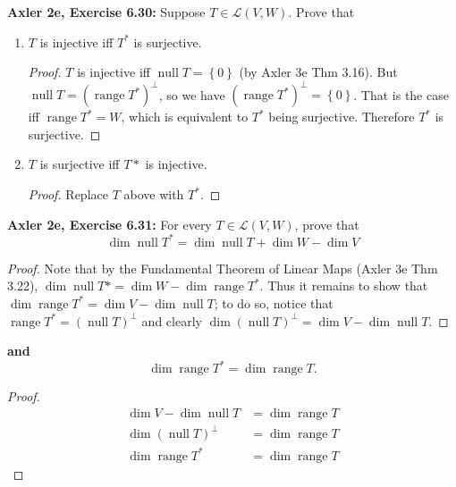 \documentclass{article}
\newcommand{\set}[1]{\left\{ #1 \right\}}
\DeclareMathOperator{\range}{range}
\DeclareMathOperator{\nulle}{null}
\begin{document}


\textbf{Axler 2e, Exercise 6.30: } %
Suppose $T \in \mathcal{L}(V, W)$. Prove that

\begin{enumerate}
    \item 
    $T$ is injective iff $T^*$ is surjective.
    \begin{proof}
        $T$ is injective iff $\nulle T = \set{0}$ (by Axler 3e Thm 3.16). But $\nulle T = (\range T^*)^\perp$, so we have $(\range T^*)^\perp = \set{0}$. That is the case iff $\range T^* = W$, which is equivalent to $T^*$ being surjective.
        Therefore $T^*$ is surjective.
    \end{proof}


    \item 
    $T$ is surjective iff $T*$ is injective.
    \begin{proof}
        Replace $T$ above with $T^*$.        
    \end{proof}
\end{enumerate}




\textbf{Axler 2e, Exercise 6.31: }
For every $T \in \mathcal{L}(V, W)$, prove that
$$\dim \nulle T^* = \dim \nulle T + \dim W - \dim V$$
\begin{proof}
    Note that by the Fundamental Theorem of Linear Maps (Axler 3e Thm 3.22), $\dim \nulle T* = \dim W - \dim \range T^*$. Thus it remains to show that $\dim \range T^* = \dim V - \dim \nulle T$; to do so, notice that $\range T^* = (\nulle T)^\perp$ and clearly $\dim (\nulle T)^\perp = \dim V - \dim \nulle T$.
\end{proof}

\textbf{and}
$$\dim \range T^* = \dim \range T.$$
\begin{proof}
    \begin{align*}
        \dim V - \dim \nulle T &= \dim \range T \\
        \dim (\nulle T)^\perp &= \dim \range T \\
        \dim \range T^* &= \dim \range T
    \end{align*}    
\end{proof}
\end{document}
